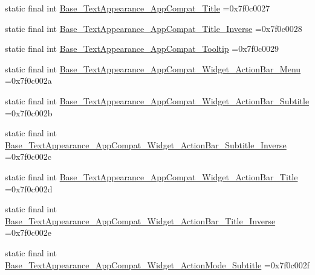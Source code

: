 \begin{DoxyCompactItemize}
\item 
static final int \mbox{\hyperlink{classbr_1_1unb_1_1cic_1_1mp_1_1marketmaster_1_1test_1_1R_1_1style_ae72b3bfa08587aa7902df84d8b8d1fa0}{Base\+\_\+\+Text\+Appearance\+\_\+\+App\+Compat\+\_\+\+Title}} =0x7f0c0027
\item 
static final int \mbox{\hyperlink{classbr_1_1unb_1_1cic_1_1mp_1_1marketmaster_1_1test_1_1R_1_1style_adcc1221b8bb6923c96edad509c5df35d}{Base\+\_\+\+Text\+Appearance\+\_\+\+App\+Compat\+\_\+\+Title\+\_\+\+Inverse}} =0x7f0c0028
\item 
static final int \mbox{\hyperlink{classbr_1_1unb_1_1cic_1_1mp_1_1marketmaster_1_1test_1_1R_1_1style_a1bab41fa1380702b37e63295ae26595d}{Base\+\_\+\+Text\+Appearance\+\_\+\+App\+Compat\+\_\+\+Tooltip}} =0x7f0c0029
\item 
static final int \mbox{\hyperlink{classbr_1_1unb_1_1cic_1_1mp_1_1marketmaster_1_1test_1_1R_1_1style_a191326b4387d68c31060a960929c7c54}{Base\+\_\+\+Text\+Appearance\+\_\+\+App\+Compat\+\_\+\+Widget\+\_\+\+Action\+Bar\+\_\+\+Menu}} =0x7f0c002a
\item 
static final int \mbox{\hyperlink{classbr_1_1unb_1_1cic_1_1mp_1_1marketmaster_1_1test_1_1R_1_1style_a47c613e60888ee79b6fcd7957c790d47}{Base\+\_\+\+Text\+Appearance\+\_\+\+App\+Compat\+\_\+\+Widget\+\_\+\+Action\+Bar\+\_\+\+Subtitle}} =0x7f0c002b
\item 
static final int \mbox{\hyperlink{classbr_1_1unb_1_1cic_1_1mp_1_1marketmaster_1_1test_1_1R_1_1style_aaaa6216bcc1c9861ce8c1f828203436c}{Base\+\_\+\+Text\+Appearance\+\_\+\+App\+Compat\+\_\+\+Widget\+\_\+\+Action\+Bar\+\_\+\+Subtitle\+\_\+\+Inverse}} =0x7f0c002c
\item 
static final int \mbox{\hyperlink{classbr_1_1unb_1_1cic_1_1mp_1_1marketmaster_1_1test_1_1R_1_1style_adf7183c76c42952ea0c094e2da78eb9b}{Base\+\_\+\+Text\+Appearance\+\_\+\+App\+Compat\+\_\+\+Widget\+\_\+\+Action\+Bar\+\_\+\+Title}} =0x7f0c002d
\item 
static final int \mbox{\hyperlink{classbr_1_1unb_1_1cic_1_1mp_1_1marketmaster_1_1test_1_1R_1_1style_a7f5324d8eb6264f9735828218fe20f73}{Base\+\_\+\+Text\+Appearance\+\_\+\+App\+Compat\+\_\+\+Widget\+\_\+\+Action\+Bar\+\_\+\+Title\+\_\+\+Inverse}} =0x7f0c002e
\item 
static final int \mbox{\hyperlink{classbr_1_1unb_1_1cic_1_1mp_1_1marketmaster_1_1test_1_1R_1_1style_a148af8e2cb20132d44422fd9d5cf056e}{Base\+\_\+\+Text\+Appearance\+\_\+\+App\+Compat\+\_\+\+Widget\+\_\+\+Action\+Mode\+\_\+\+Subtitle}} =0x7f0c002f
\item 

\end{DoxyCompactItemize}
